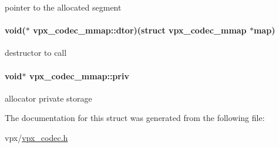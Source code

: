 pointer to the allocated segment \hypertarget{structvpx__codec__mmap_a39476b4d60e41d0867e0966f09dc1e45}{
\paragraph[{dtor}]{\setlength{\rightskip}{0pt plus 5cm}void($\ast$ vpx\-\_\-codec\-\_\-mmap\-::dtor)(struct {\bf vpx\-\_\-codec\-\_\-mmap} $\ast$map)}}\label{structvpx__codec__mmap_a39476b4d60e41d0867e0966f09dc1e45}
destructor to call \hypertarget{structvpx__codec__mmap_ac2be21bb5e6d94332fff9c5f1263224f}{
\paragraph[{priv}]{\setlength{\rightskip}{0pt plus 5cm}void$\ast$ vpx\-\_\-codec\-\_\-mmap\-::priv}}\label{structvpx__codec__mmap_ac2be21bb5e6d94332fff9c5f1263224f}
allocator private storage 

The documentation for this struct was generated from the following file\-:\begin{DoxyCompactItemize}
\item 
vpx/\hyperlink{vpx__codec_8h}{vpx\-\_\-codec.\-h}\end{DoxyCompactItemize}

